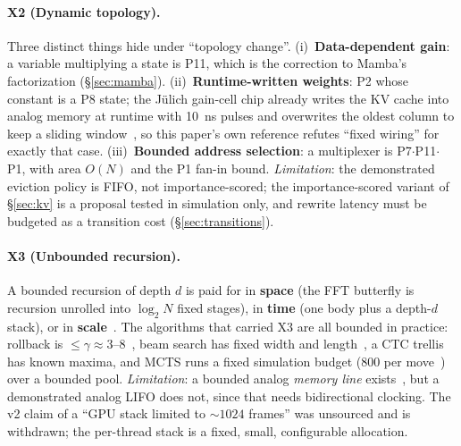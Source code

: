 \documentclass[11pt]{article}
\begin{document}
\paragraph{X2 (Dynamic topology).} Three distinct things hide under ``topology change''. (i)~\textbf{Data-dependent gain}: a variable multiplying a state is P11, which is the correction to Mamba's factorization (\S\ref{sec:mamba}). (ii)~\textbf{Runtime-written weights}: P2 whose constant is a P8 state; the J\"ulich gain-cell chip already writes the KV cache into analog memory at runtime with 10~ns pulses and overwrites the oldest column to keep a sliding window~\cite{leroux2025a}, so this paper's own reference refutes ``fixed wiring'' for exactly that case. (iii)~\textbf{Bounded address selection}: a multiplexer is P7$\cdot$P11$\cdot$P1, with area $O(N)$ and the P1 fan-in bound. \textit{Limitation}: the demonstrated eviction policy is FIFO, not importance-scored; the importance-scored variant of \S\ref{sec:kv} is a proposal tested in simulation only, and rewrite latency must be budgeted as a transition cost (\S\ref{sec:transitions}).

\paragraph{X3 (Unbounded recursion).} A bounded recursion of depth $d$ is paid for in \textbf{space} (the FFT butterfly is recursion unrolled into $\log_2 N$ fixed stages), in \textbf{time} (one body plus a depth-$d$ stack), or in \textbf{scale}~\cite{friedman2001}. The algorithms that carried X3 are all bounded in practice: rollback is $\le\gamma \approx 3$--$8$~\cite{leviathan2023}, beam search has fixed width and length~\cite{freitag2017}, a CTC trellis has known maxima, and MCTS runs a fixed simulation budget (800 per move~\cite{silver2018}) over a bounded pool. \textit{Limitation}: a bounded analog \textit{memory line} exists~\cite{sangster1969,boyle1970}, but a demonstrated analog LIFO does not, since that needs bidirectional clocking. The v2 claim of a ``GPU stack limited to ${\sim}1024$ frames'' was unsourced and is withdrawn; the per-thread stack is a fixed, small, configurable allocation.
\end{document}
